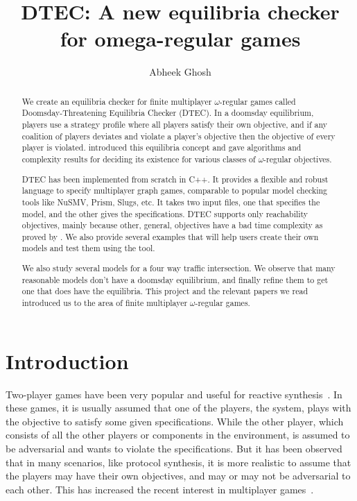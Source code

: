 \documentclass[format=acmsmall, review=false]{acmart}
\begin{document}
\title[DTEC]{DTEC: A new equilibria checker for omega-regular games}
\author{Abheek Ghosh}



\begin{abstract}
We create an equilibria checker for finite multiplayer $\omega$-regular games called Doomsday-Threatening Equilibria Checker (DTEC). In a doomsday equilibrium, players use a strategy profile where all players satisfy their own objective, and if any coalition of players deviates and violate a player's objective then the objective of every player is violated. \cite{chatterjee2014doomsday} introduced this equilibria concept and gave algorithms and complexity results for deciding its existence for various classes of $\omega$-regular objectives.

DTEC has been implemented from scratch in C++. It provides a flexible and robust language to specify multiplayer graph games, comparable to popular model checking tools like NuSMV, Prism, Slugs, etc. It takes two input files, one that specifies the model, and the other gives the specifications. DTEC supports only reachability objectives, mainly because other, general, objectives have a bad time complexity as proved by \cite{chatterjee2014doomsday}. We also provide several examples that will help users create their own models and test them using the tool.

We also study several models for a four way traffic intersection. We observe that many reasonable models don't have a doomsday equilibrium, and finally refine them to get one that does have the equilibria. This project and the relevant papers we read introduced us to the area of finite multiplayer $\omega$-regular games.
\end{abstract}

\maketitle

\section{Introduction}
Two-player games have been very popular and useful for reactive synthesis~\cite{shapley1953stochastic,emerson1991tree,martin1975borel}. In these games, it is usually assumed that one of the players, the system, plays with the objective to satisfy some given specifications. While the other player, which consists of all the other players or components in the environment, is assumed to be adversarial and wants to violate the specifications. But it has been observed that in many scenarios, like protocol synthesis, it is more realistic to assume that the players may have their own objectives, and may or may not be adversarial to each other. This has increased the recent interest in multiplayer games~\cite{dana2010book,ummels2011complexity,chatterjee2006secure}.
\end{document}
